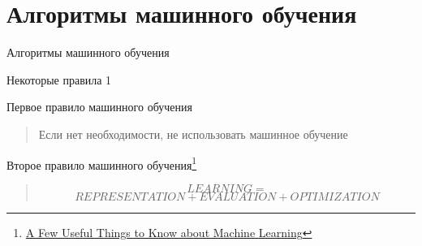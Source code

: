 \documentclass[10pt]{beamer}
\begin{document}

\section{Алгоритмы машинного обучения}


\begin{frame}{}

\begin{center}
\Large Алгоритмы машинного обучения
\end{center}

\end{frame}

\begin{frame}{Некоторые правила 1}

Первое правило машинного обучения
\begin{quote}
Если нет необходимости, не использовать машинное обучение
\end{quote}

Второе правило машинного обучения\footnote{\href{https://homes.cs.washington.edu/~pedrod/papers/cacm12.pdf}{A Few Useful Things to Know about Machine Learning}}
\begin{quote}
\[
LEARNING =
\]
\[
REPRESENTATION + EVALUATION + OPTIMIZATION
\]
\end{quote}

\end{frame}
\end{document}
